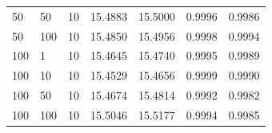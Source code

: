 \begin{table}[!htb]
\begin{center}
\begin{tabular}{l@{\hskip 0.5em}l@{\hskip 0.5em}l|r@{\hskip 0.5em}r@{\hskip 0.5em}r@{\hskip 0.5em}r}
    50 &              50 &                   10 &     15.4883 &    15.5000 &     0.9996 &    0.9986 \\
    50 &             100 &                   10 &     15.4850 &    15.4956 &     0.9998 &    0.9994 \\
    100 &               1 &                   10 &     15.4645 &    15.4740 &     0.9995 &    0.9989 \\
    100 &              10 &                   10 &     15.4529 &    15.4656 &     0.9999 &    0.9990 \\
    100 &              50 &                   10 &     15.4674 &    15.4814 &     0.9992 &    0.9982 \\
    100 &             100 &                   10 &     15.5046 &    15.5177 &     0.9994 &    0.9985 \\
\bottomrule
    \end{tabular}
    \end{center}
\end{table}
\endgroup
\normalsize

